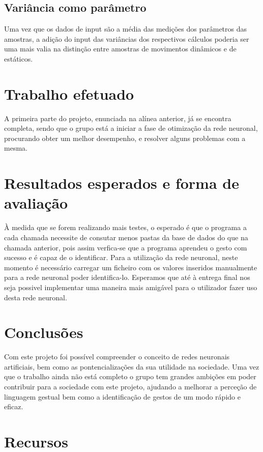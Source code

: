 \documentclass[10pt,a4paper]{article}
\begin{document}
\subsection{Variância como parâmetro}
Uma vez que os dados de input são a média das medições dos parâmetros das amostras, a adição do input das variâncias dos respectivos cálculos poderia ser uma mais valia na distinção entre amostras de movimentos dinâmicos e de estáticos.

\section{Trabalho efetuado}
\subitem

A primeira parte do projeto, enunciada na alínea anterior, já se encontra completa, sendo que o grupo está a iniciar a fase de otimização da rede neuronal, procurando obter um melhor desempenho, e resolver alguns problemas com a mesma.


\section{Resultados esperados e forma de avaliação}
\subitem

À medida que se forem realizando mais testes, o esperado é que o programa a cada chamada necessite de consutar menos pastas da base de dados do que na chamada anterior, pois assim verfica-se que a programa aprendeu o gesto com sucesso e é capaz de o identificar.
Para a utilização da rede neuronal, neste momento é necessário carregar um ficheiro com os valores inseridos manualmente para a rede neuronal poder identifica-lo. Esperamos que até à entrega final nos seja possivel implementar uma maneira mais amigável para o utilizador fazer uso desta rede neuronal.

\section{Conclusões}
\subitem

Com este projeto foi possível compreender o conceito de redes neuronais artificiais, bem como as pontencializações da sua utilidade na sociedade. Uma vez que o trabalho ainda não está completo o grupo tem grandes ambições em poder contribuir para a sociedade com este projeto, ajudando a melhorar a perceção de linguagem gestual bem como a identificação de gestos de um modo rápido e eficaz.

\section{Recursos}
\end{document}
